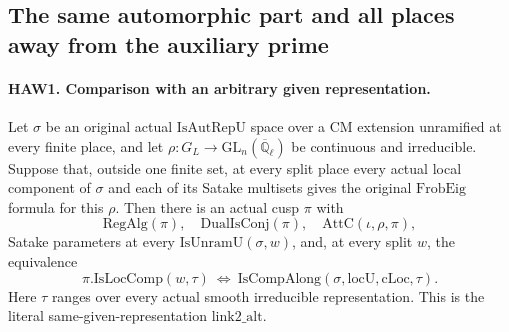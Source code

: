 \documentclass[11pt,a4paper]{article}
\numberwithin{equation}{section}
\theoremstyle{remark}\newtheorem{remark}[theorem]{Remark}
\begin{document}
\subsection{The same automorphic part and all places away from the auxiliary prime}

\paragraph{HAW1. Comparison with an arbitrary given representation.}
\label{claim:HAW1}
Let $\sigma$ be an original actual $\mathrm{IsAutRepU}$ space
over a CM extension unramified at every finite place, and let
$\rho:G_L\to\mathrm{GL}_n(\overline{\mathbb Q}_\ell)$ be
continuous and irreducible.  Suppose that, outside one finite set,
at every split place every actual local component of $\sigma$
and each of its Satake multisets gives the original
$\mathrm{FrobEig}$ formula for this $\rho$.  Then there is an
actual cusp $\pi$ with
\[
 \mathrm{RegAlg}(\pi),\quad \mathrm{DualIsConj}(\pi),\quad
 \mathrm{AttC}(\iota,\rho,\pi),
 \tag{HAW.4}
\]
Satake parameters at every $\mathrm{IsUnramU}(\sigma,w)$,
and, at every split $w$, the equivalence
\[
 \pi.\mathrm{IsLocComp}(w,\tau)
 \ \Longleftrightarrow\
 \mathrm{IsCompAlong}(\sigma,\mathrm{locU},\mathrm{cLoc},\tau).
 \tag{HAW.5}
\]
Here $\tau$ ranges over every actual smooth irreducible representation.
This is the literal same-given-representation $\mathrm{link2\_\allowbreak alt}$.
\end{document}
